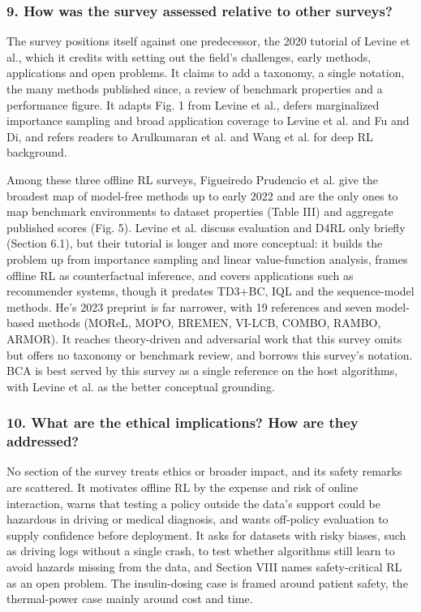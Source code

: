 \documentclass[11pt]{article}
\newcommand{\question}[1]{\subsubsection*{#1}}
\begin{document}
\question{9. How was the survey assessed relative to other surveys?}

The survey positions itself against one predecessor, the 2020 tutorial of Levine et al., which it credits with setting out the field's challenges, early methods, applications and open problems. It claims to add a taxonomy, a single notation, the many methods published since, a review of benchmark properties and a performance figure. It adapts Fig. 1 from Levine et al., defers marginalized importance sampling and broad application coverage to Levine et al. and Fu and Di, and refers readers to Arulkumaran et al. and Wang et al. for deep RL background.

Among these three offline RL surveys, Figueiredo Prudencio et al. give the broadest map of model-free methods up to early 2022 and are the only ones to map benchmark environments to dataset properties (Table III) and aggregate published scores (Fig. 5). Levine et al. discuss evaluation and D4RL only briefly (Section 6.1), but their tutorial is longer and more conceptual: it builds the problem up from importance sampling and linear value-function analysis, frames offline RL as counterfactual inference, and covers applications such as recommender systems, though it predates TD3+BC, IQL and the sequence-model methods. He's 2023 preprint is far narrower, with 19 references and seven model-based methods (MOReL, MOPO, BREMEN, VI-LCB, COMBO, RAMBO, ARMOR). It reaches theory-driven and adversarial work that this survey omits but offers no taxonomy or benchmark review, and borrows this survey's notation. BCA is best served by this survey as a single reference on the host algorithms, with Levine et al. as the better conceptual grounding.

\question{10. What are the ethical implications? How are they addressed?}

No section of the survey treats ethics or broader impact, and its safety remarks are scattered. It motivates offline RL by the expense and risk of online interaction, warns that testing a policy outside the data's support could be hazardous in driving or medical diagnosis, and wants off-policy evaluation to supply confidence before deployment. It asks for datasets with risky biases, such as driving logs without a single crash, to test whether algorithms still learn to avoid hazards missing from the data, and Section VIII names safety-critical RL as an open problem. The insulin-dosing case is framed around patient safety, the thermal-power case mainly around cost and time.
\end{document}
